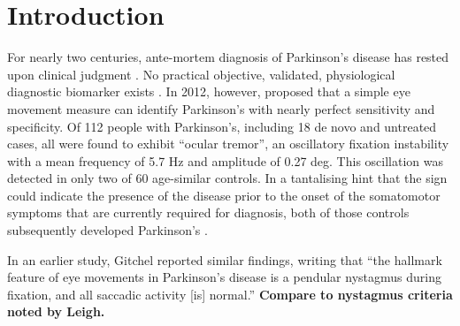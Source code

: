 \documentclass[jou,a4paper]{apa6}
\begin{document}
\begin{figure}[!b]
\end{figure}

\section{Introduction}

For nearly two centuries, ante-mortem diagnosis of Parkinson's disease has rested upon clinical judgment \citep{Hughes1992Accuracy-of-cli}. No practical objective, validated, physiological diagnostic biomarker exists \citep{Sharma2013Biomarkers-in-P}. In 2012, however, \citeauthor{Gitchel2012Pervasive-ocula} proposed that a simple eye movement measure can identify Parkinson's with nearly perfect sensitivity and specificity. Of 112 people with Parkinson's, including 18 de novo and untreated cases, all were found to  exhibit ``ocular tremor'', an oscillatory fixation instability with a mean frequency of 5.7 Hz and amplitude of 0.27 deg. This oscillation was detected in only two of 60 age-similar controls. In a tantalising hint that the sign could indicate the presence of the disease prior to the onset of the somatomotor symptoms that are currently required for diagnosis, both of those controls subsequently developed Parkinson's \citep{Gitchel2014Experimental-su}.

In an earlier study, Gitchel \citeyearpar{Gitchel2009Oculomotor-cont} reported similar findings, writing that ``the hallmark feature of eye movements in Parkinson's disease is a pendular nystagmus during fixation, and all saccadic activity [is] normal.'' \textbf{Compare to nystagmus criteria noted by Leigh.}
\end{document}
